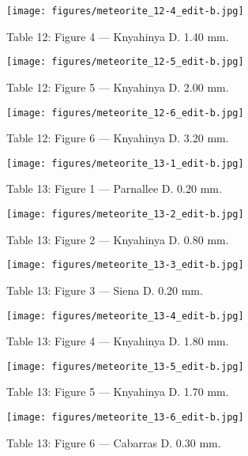 \documentclass[a4paper, 12pt, oneside]{article}
\begin{document}
\begin{figure}[t]
\texttt{[image: figures/meteorite\_12-4\_edit-b.jpg]}
\caption{Table 12: Figure 4 --- Knyahinya D. 1.40 mm.}
\centering
\end{figure}
\clearpage
\begin{figure}[t]
\texttt{[image: figures/meteorite\_12-5\_edit-b.jpg]}
\caption{Table 12: Figure 5 --- Knyahinya D. 2.00 mm.}
\centering
\end{figure}
\clearpage
\begin{figure}[t]
\texttt{[image: figures/meteorite\_12-6\_edit-b.jpg]}
\caption{Table 12: Figure 6 --- Knyahinya D. 3.20 mm.}
\centering
\end{figure}
\clearpage
{}
\begin{figure}[t]
\texttt{[image: figures/meteorite\_13-1\_edit-b.jpg]}
\caption{Table 13: Figure 1 --- Parnallee D. 0.20 mm.}
\centering
\end{figure}
\clearpage
\begin{figure}[t]
\texttt{[image: figures/meteorite\_13-2\_edit-b.jpg]}
\caption{Table 13: Figure 2 --- Knyahinya D. 0.80 mm.}
\centering
\end{figure}
\clearpage
\begin{figure}[t]
\texttt{[image: figures/meteorite\_13-3\_edit-b.jpg]}
\caption{Table 13: Figure 3 --- Siena D. 0.20 mm.}
\centering
\end{figure}
\clearpage
\begin{figure}[t]
\texttt{[image: figures/meteorite\_13-4\_edit-b.jpg]}
\caption{Table 13: Figure 4 --- Knyahinya D. 1.80 mm.}
\centering
\end{figure}
\clearpage
\begin{figure}[t]
\texttt{[image: figures/meteorite\_13-5\_edit-b.jpg]}
\caption{Table 13: Figure 5 --- Knyahinya D. 1.70 mm.}
\centering
\end{figure}
\clearpage
\begin{figure}[t]
\texttt{[image: figures/meteorite\_13-6\_edit-b.jpg]}
\caption{Table 13: Figure 6 --- Cabarras D. 0.30 mm.}
\centering
\end{figure}
\end{document}
